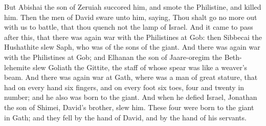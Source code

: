But Abishai the son of Zeruiah succored him, and smote the Philistine, and killed him. Then the men of David sware unto him, saying, Thou shalt go no more out with us to battle, that thou quench not the lamp of Israel.  And it came to pass after this, that there was again war with the Philistines at Gob: then Sibbecai the Hushathite slew Saph, who was of the sons of the giant. And there was again war with the Philistines at Gob; and Elhanan the son of Jaare-oregim the Beth-lehemite slew Goliath the Gittite, the staff of whose spear was like a weaver’s beam. And there was again war at Gath, where was a man of great stature, that had on every hand six fingers, and on every foot six toes, four and twenty in number; and he also was born to the giant. And when he defied Israel, Jonathan the son of Shimei, David’s brother, slew him. These four were born to the giant in Gath; and they fell by the hand of David, and by the hand of his servants. 

